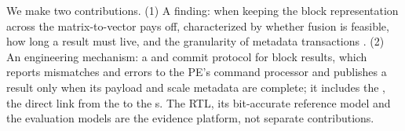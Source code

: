 %
We make two contributions.
(1) A finding: when keeping the block representation across the matrix-to-vector \handoff pays off, characterized by whether fusion is feasible, how long a result must live, and the granularity of metadata transactions .
(2) An engineering mechanism: a \failvisible \handoff and commit protocol for block results, which reports mismatches and errors to the PE's command processor and publishes a result only when its payload and scale metadata are complete; it includes the \FastPath, the direct link from the \TensorUnit to the \VectorCore{}s.
The RTL, its bit-accurate reference model and the evaluation models are the evidence platform, not separate contributions.
